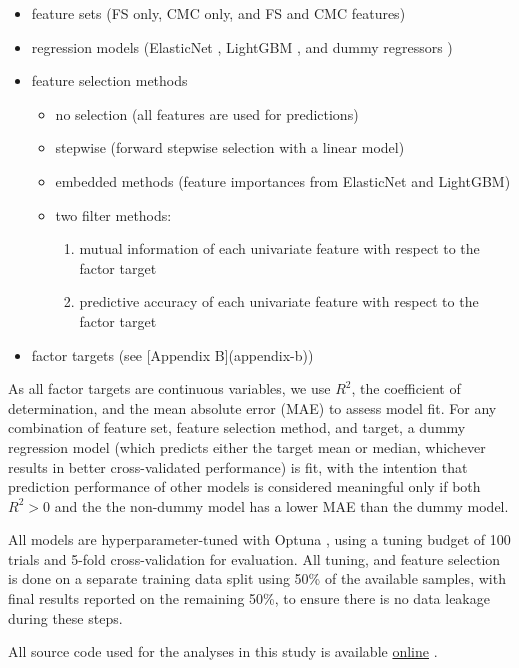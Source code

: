 \documentclass{article}
\begin{document}
\begin{itemize}
\item feature sets (FS only, CMC only, and FS and CMC features)
\item regression models (ElasticNet \citep{Zou2005,JMLR:v12:pedregosa11a},
LightGBM \citep{LightGBMNIPS2017}, and dummy regressors
\citep{JMLR:v12:pedregosa11a})
\item feature selection methods
	\begin{itemize}
		\item no selection (all features are used for predictions)
		\item stepwise (forward stepwise selection with a linear model)
		\item embedded methods (feature importances from ElasticNet and LightGBM)
		\item two filter methods:
		\begin{enumerate}
			\item mutual information of each univariate feature with respect to the
			factor target
			\item predictive accuracy of each univariate feature with respect to
			the factor target
		\end{enumerate}
	\end{itemize}
\item factor targets (see [Appendix B](appendix-b))
\end{itemize}

As all factor targets are continuous variables, we use \(R^2\), the
coefficient of determination, and the mean absolute error (MAE) to assess
model fit. For any combination of feature set, feature selection method, and
target, a dummy regression model (which predicts either the target mean or
median, whichever results in better cross-validated performance) is fit, with
the intention that prediction performance of other models is considered
meaningful only if both \(R^2 > 0\) and the the non-dummy model has a lower MAE
than the dummy model.

All models are hyperparameter-tuned with Optuna \citep{Optuna2019}, using a
tuning budget of 100 trials and 5-fold cross-validation for evaluation. All
tuning, and feature selection is done on a separate training data split using
50\% of the available samples, with final results reported on the remaining
50\%, to ensure there is no data leakage during these steps.

All source code used for the analyses in this study is available
\href{https://github.com/stfxecutables/cortical_congruence}{online}
\citep{dm-bergerStfxecutablesCortical_congruenceInit2024}.
\end{document}
